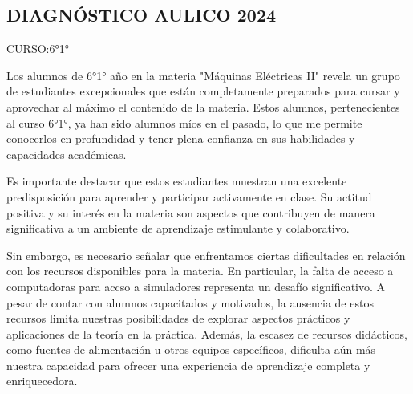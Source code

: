 \documentclass[planificacion2024.tex]{subfiles}
\begin{document}

\subsection*{\centering DIAGNÓSTICO AULICO 2024}

\vspace{1cm}

CURSO:6°1°

\vspace{1cm}

Los alumnos de 6°1° año en la materia "Máquinas Eléctricas II" revela un grupo de estudiantes excepcionales que están completamente preparados para cursar y aprovechar al máximo el contenido de la materia. Estos alumnos, pertenecientes al curso 6°1°, ya han sido alumnos míos en el pasado, lo que me permite conocerlos en profundidad y tener plena confianza en sus habilidades y capacidades académicas.

Es importante destacar que estos estudiantes muestran una excelente predisposición para aprender y participar activamente en clase. Su actitud positiva y su interés en la materia son aspectos que contribuyen de manera significativa a un ambiente de aprendizaje estimulante y colaborativo.

Sin embargo, es necesario señalar que enfrentamos ciertas dificultades en relación con los recursos disponibles para la materia. En particular, la falta de acceso a computadoras para accso a simuladores representa un desafío significativo. A pesar de contar con alumnos capacitados y motivados, la ausencia de estos recursos limita nuestras posibilidades de explorar aspectos prácticos y aplicaciones de la teoría en la práctica. Además, la escasez de recursos didácticos, como fuentes de alimentación u otros equipos específicos, dificulta aún más nuestra capacidad para ofrecer una experiencia de aprendizaje completa y enriquecedora.
\end{document}
